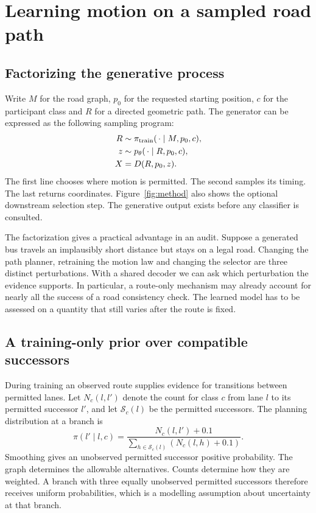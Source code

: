 \chapter{Learning motion on a sampled road path}
\label{ch:generator}
\section{Factorizing the generative process}
Write $M$ for the road graph, $p_0$ for the requested starting position, $c$ for the participant class and $R$ for a directed geometric path. The generator can be expressed as the following sampling program:
\begin{align}
R &\sim \pi_{\rm train}(\,\cdot\mid M,p_0,c),\\
z &\sim p_\theta(\,\cdot\mid R,p_0,c),\\
X &= D(R,p_0,z).
\end{align}
The first line chooses where motion is permitted. The second samples its timing. The last returns coordinates. Figure~\ref{fig:method} also shows the optional downstream selection step. The generative output exists before any classifier is consulted.

The factorization gives a practical advantage in an audit. Suppose a generated bus travels an implausibly short distance but stays on a legal road. Changing the path planner, retraining the motion law and changing the selector are three distinct perturbations. With a shared decoder we can ask which perturbation the evidence supports. In particular, a route-only mechanism may already account for nearly all the success of a road consistency check. The learned model has to be assessed on a quantity that still varies after the route is fixed.

\section{A training-only prior over compatible successors}
During training an observed route supplies evidence for transitions between permitted lanes. Let $N_c(l,l')$ denote the count for class $c$ from lane $l$ to its permitted successor $l'$, and let $\mathcal S_c(l)$ be the permitted successors. The planning distribution at a branch is
\begin{equation}
 \pi(l'\mid l,c)=
 \frac{N_c(l,l')+0.1}{\sum_{h\in\mathcal S_c(l)}(N_c(l,h)+0.1)}.
\end{equation}
Smoothing gives an unobserved permitted successor positive probability. The graph determines the allowable alternatives. Counts determine how they are weighted. A branch with three equally unobserved permitted successors therefore receives uniform probabilities, which is a modelling assumption about uncertainty at that branch.

